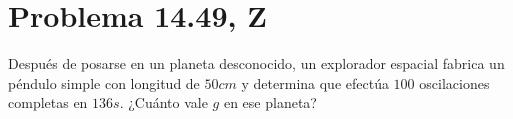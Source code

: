 \section*{Problema 14.49, Z}

\noindent Después de posarse en un planeta desconocido, un explorador espacial fabrica un péndulo simple con longitud de $50cm$  y determina que efectúa $100$ oscilaciones completas en $136s$. ¿Cuánto vale $g$ en ese planeta?

